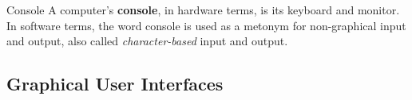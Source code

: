 \begin{defn}{Console}
A computer's \textbf{console}, in hardware terms, is its keyboard and monitor.  In software terms, the word console is used as a metonym for non-graphical input and output, also called \textit{character-based} input and output.
\end{defn}

\subsection{Graphical User Interfaces}
